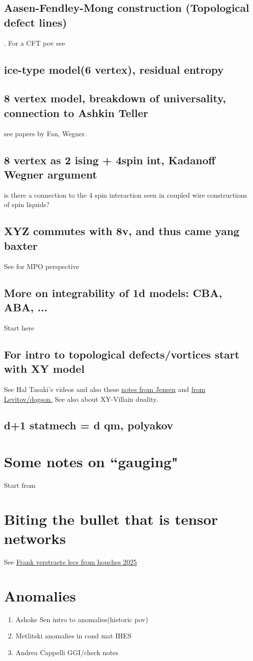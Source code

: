 \documentclass{article}
\begin{document}
\subsection{Aasen-Fendley-Mong construction (Topological defect lines)}
\cite{Aasen_2016}. For a CFT pov see \cite{Chang_2019}
\subsection{ice-type model(6 vertex), residual entropy}
\subsection{8 vertex model, breakdown of universality, connection to Ashkin Teller}
see papers by Fan, Wegner.
\subsection{8 vertex as 2 ising + 4spin int, Kadanoff Wegner argument}
is there a connection to the 4 spin interaction seen in coupled wire constructions of spin liquids?
\subsection{XYZ commutes with 8v, and thus came yang baxter}
See \cite{fendley2025xyzintegrabilityeasyway} for MPO perspective 
\subsection{More on integrability of 1d models: CBA, ABA, ...}
Start here \cite{Franchini_2017}
\subsection{For intro to topological defects/vortices start with XY model}
See Hal Tasaki's videos and also these \href{https://www.mit.edu/~levitov/8.334/notes/XYnotes1.pdf}{notes from Jensen} and \href{https://www.mit.edu/~levitov/8.334/notes/m6.pdf}{from Levitov/dogson.} See also about XY-Villain duality.
\subsection{d+1 statmech = d qm, polyakov}
\section{Some notes on ``gauging"}
Start from \cite{Haegeman_2015}
\section{Biting the bullet that is tensor networks}
See \href{https://videos.univ-grenoble-alpes.fr/video/33697-2025_08_14_11_08_verstraete-1/}{Frank verstraete lecs from houches 2025}
\section{Anomalies}
\begin{enumerate}
    \item Ashoke Sen intro to anomalies(historic pov)
    \item Metlitski anomalies in cond mat IHES
    \item Andrea Cappelli GGI/check notes
\end{enumerate}
 


\end{document}
